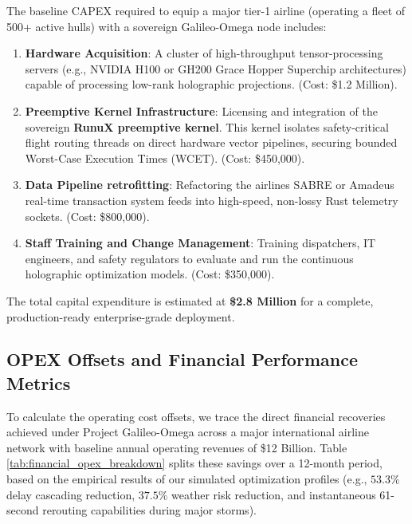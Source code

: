 \documentclass[11pt,a4paper]{book}
\begin{document}
The baseline CAPEX required to equip a major tier-1 airline (operating a fleet of 500+ active hulls) with a sovereign Galileo-Omega node includes:
\begin{enumerate}
    \item \textbf{Hardware Acquisition}: A cluster of high-throughput tensor-processing servers (e.g., NVIDIA H100 or GH200 Grace Hopper Superchip architectures) capable of processing low-rank holographic projections. (Cost: \$1.2 Million).
    \item \textbf{Preemptive Kernel Infrastructure}: Licensing and integration of the sovereign \textbf{RunuX preemptive kernel}. This kernel isolates safety-critical flight routing threads on direct hardware vector pipelines, securing bounded Worst-Case Execution Times (WCET). (Cost: \$450,000).
    \item \textbf{Data Pipeline retrofitting}: Refactoring the airlines SABRE or Amadeus real-time transaction system feeds into high-speed, non-lossy Rust telemetry sockets. (Cost: \$800,000).
    \item \textbf{Staff Training and Change Management}: Training dispatchers, IT engineers, and safety regulators to evaluate and run the continuous holographic optimization models. (Cost: \$350,000).
\end{enumerate}

The total capital expenditure is estimated at \textbf{\$2.8 Million} for a complete, production-ready enterprise-grade deployment.

\subsection{OPEX Offsets and Financial Performance Metrics}\label{subsec:opex_offsets}

To calculate the operating cost offsets, we trace the direct financial recoveries achieved under Project Galileo-Omega across a major international airline network with baseline annual operating revenues of \$12 Billion. Table \ref{tab:financial_opex_breakdown} splits these savings over a 12-month period, based on the empirical results of our simulated optimization profiles (e.g., $53.3\%$ delay cascading reduction, $37.5\%$ weather risk reduction, and instantaneous 61-second rerouting capabilities during major storms).
\end{document}
